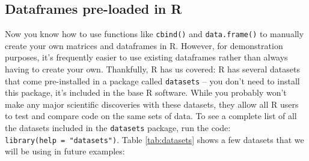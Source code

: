 \documentclass[]{book}
\newenvironment{Shaded}{\begin{snugshade}}{\end{snugshade}}
\newcommand{\KeywordTok}[1]{\textcolor[rgb]{0.13,0.29,0.53}{\textbf{#1}}}
\newcommand{\CommentTok}[1]{\textcolor[rgb]{0.56,0.35,0.01}{\textit{#1}}}
\newcommand{\NormalTok}[1]{#1}
\theoremstyle{definition}
\theoremstyle{definition}
\theoremstyle{remark}
\begin{document}
\begin{Shaded}
\end{Shaded}

\subsection{Dataframes pre-loaded in
R}\label{dataframes-pre-loaded-in-r}

Now you know how to use functions like \texttt{cbind()} and
\texttt{data.frame()} to manually create your own matrices and
dataframes in R. However, for demonstration purposes, it's frequently
easier to use existing dataframes rather than always having to create
your own. Thankfully, R has us covered: R has several datasets that come
pre-installed in a package called \texttt{datasets} -- you don't need to
install this package, it's included in the base R software. While you
probably won't make any major scientific discoveries with these
datasets, they allow all R users to test and compare code on the same
sets of data. To see a complete list of all the datasets included in the
\texttt{datasets} package, run the code:
\texttt{library(help\ =\ "datasets")}. Table \ref{tab:datasets} shows a
few datasets that we will be using in future examples:
\end{document}
